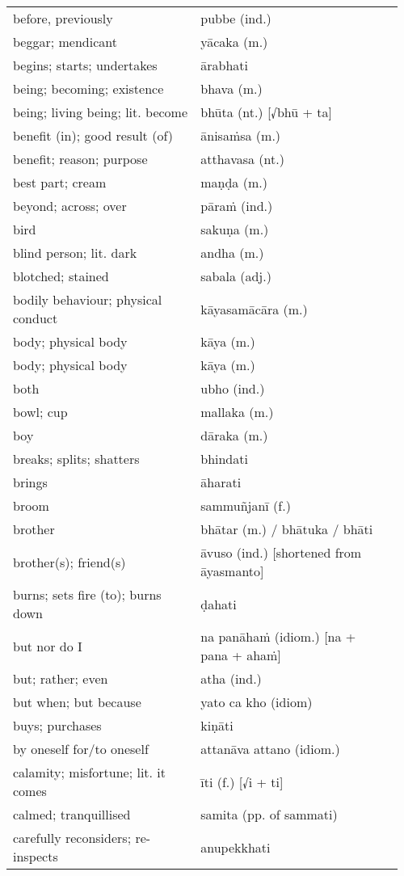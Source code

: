 \documentclass[a5paper]{memoir}
\begin{document}
\begin{longtable}{L{0.48\linewidth} L{0.48\linewidth} H}
before, previously & pubbe (ind.) & \\
beggar; mendicant & yācaka (m.) & \\
begins; starts; undertakes & ārabhati & \\
being; becoming; existence & bhava (m.) & \\
being; living being; lit. become & bhūta (nt.) [√bhū + ta] & \\
benefit (in); good result (of) & ānisaṁsa (m.) & \\
benefit; reason; purpose & atthavasa (nt.) & \\
best part; cream & maṇḍa (m.) & \\
beyond; across; over & pāraṁ (ind.) & \\
bird & sakuṇa (m.) & \\
blind person; lit. dark & andha (m.) & \\
blotched; stained & sabala (adj.) & \\
bodily behaviour; physical conduct & kāyasamācāra (m.) & \\
body; physical body & kāya (m.) & \\
body; physical body & kāya (m.) & \\
both & ubho (ind.) & \\
bowl; cup & mallaka (m.) & \\
boy & dāraka (m.) & \\
breaks; splits; shatters & bhindati & \\
brings & āharati & \\
broom & sammuñjanī (f.) & \\
brother & bhātar (m.) / bhātuka / bhāti & \\
brother(s); friend(s) & āvuso (ind.) [shortened from āyasmanto] & \\
burns; sets fire (to); burns down & ḍahati & \\
but nor do I & na panāhaṁ (idiom.) [na + pana + ahaṁ] & \\
but; rather; even & atha (ind.) & \\
but when; but because & yato ca kho (idiom) & \\
buys; purchases & kiṇāti & \\
by oneself for/to oneself & attanāva attano (idiom.) & \\
calamity; misfortune; lit. it comes & īti (f.) [√i + ti] & \\
calmed; tranquillised & samita (pp. of sammati) & \\
carefully reconsiders; re-inspects & anupekkhati & \\

\end{longtable}
\end{document}
